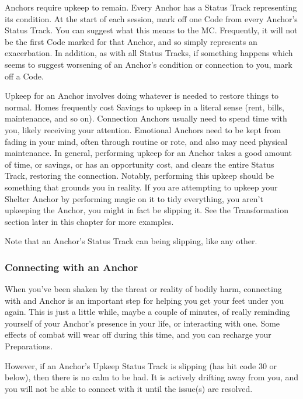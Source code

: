 \documentclass[
  oneside,
  statementpaper,
  9pt]{memoir}
\begin{document}
\begin{Player}

Anchors require upkeep to remain. Every Anchor has a Status Track representing its condition. At the start of each session, mark off one Code from every Anchor’s Status Track. You can suggest what this means to the MC. Frequently, it will not be the first Code marked for that Anchor, and so simply represents an exacerbation. In addition, as with all Status Tracks, if something happens which seems to suggest worsening of an Anchor’s condition or connection to you, mark off a Code.

Upkeep for an Anchor involves doing whatever is needed to restore things to normal. Homes frequently cost Savings to upkeep in a literal sense (rent, bills, maintenance, and so on). Connection Anchors usually need to spend time with you, likely receiving your attention. Emotional Anchors need to be kept from fading in your mind, often through routine or rote, and also may need physical maintenance. In general, performing upkeep for an Anchor takes a good amount of time, or savings, or has an opportunity cost, and clears the entire Status Track, restoring the connection. Notably, performing this upkeep should be something that grounds you in reality. If you are attempting to upkeep your Shelter Anchor by performing magic on it to tidy everything, you aren’t upkeeping the Anchor, you might in fact be slipping it. See the Transformation section later in this chapter for more examples.

Note that an Anchor’s Status Track can being slipping, like any other.

\end{Player}

\hypertarget{connecting-with-an-anchor}{%
\subsubsection{Connecting with an
Anchor}\label{connecting-with-an-anchor}}

\begin{Player}

When you’ve been shaken by the threat or reality of bodily harm, connecting with and Anchor is an important step for helping you get your feet under you again. This is just a little while, maybe a couple of minutes, of really reminding yourself of your Anchor’s presence in your life, or interacting with one. Some effects of combat will wear off during this time, and you can recharge your Preparations.

However, if an Anchor’s Upkeep Status Track is slipping (has hit code 30 or below), then there is no calm to be had. It is actively drifting away from you, and you will not be able to connect with it until the issue(s) are resolved.

\end{Player}
\end{document}
